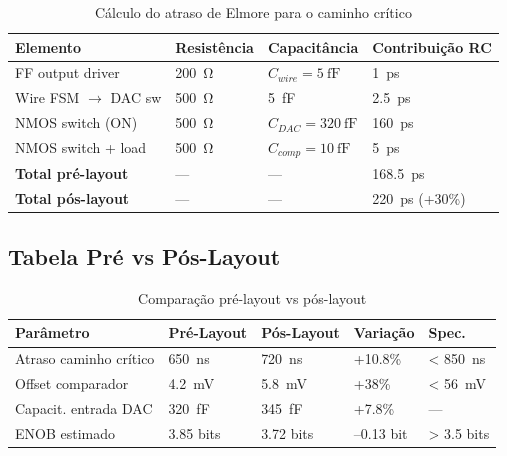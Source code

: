 \documentclass[12pt,a4paper]{article}
\begin{document}
\begin{table}[H]
  \centering
  \caption{Cálculo do atraso de Elmore para o caminho crítico}
  \label{tab:elmore}
  \begin{tabular}{llll}
    \toprule
    \textbf{Elemento} & \textbf{Resistência} & \textbf{Capacitância} &
    \textbf{Contribuição RC} \\
    \midrule
    FF output driver       & \SI{200}{\ohm}  & $C_{wire} = \SI{5}{\femto\farad}$ & \SI{1}{\pico\second} \\
    Wire FSM $\to$ DAC sw      & \SI{500}{\ohm}  & \SI{5}{\femto\farad}  & \SI{2.5}{\pico\second} \\
    NMOS switch (ON)       & \SI{500}{\ohm}  & $C_{DAC} = \SI{320}{\femto\farad}$ & \SI{160}{\pico\second} \\
    NMOS switch + load     & \SI{500}{\ohm}  & $C_{comp} = \SI{10}{\femto\farad}$ & \SI{5}{\pico\second} \\
    \midrule
    \textbf{Total pré-layout}  & --- & --- & \SI{168.5}{\pico\second} \\
    \textbf{Total pós-layout}  & --- & --- & \SI{220}{\pico\second} (+30\%) \\
    \bottomrule
  \end{tabular}
\end{table}

\subsection{Tabela Pré vs Pós-Layout}

\begin{table}[H]
  \centering
  \caption{Comparação pré-layout vs pós-layout}
  \label{tab:pre_pos}
  \begin{tabular}{lllll}
    \toprule
    \textbf{Parâmetro} & \textbf{Pré-Layout} & \textbf{Pós-Layout} &
    \textbf{Variação} & \textbf{Spec.} \\
    \midrule
    Atraso caminho crítico & \SI{650}{\nano\second} & \SI{720}{\nano\second} & +10.8\% & < \SI{850}{\nano\second} \\
    Offset comparador      & \SI{4.2}{\milli\volt}  & \SI{5.8}{\milli\volt}  & +38\%   & < \SI{56}{\milli\volt}  \\
    Capacit. entrada DAC   & \SI{320}{\femto\farad} & \SI{345}{\femto\farad} & +7.8\%  & --- \\
    ENOB estimado          & 3.85 bits & 3.72 bits & --0.13 bit & > 3.5 bits \\
    \bottomrule
  \end{tabular}
\end{table}
\end{document}
